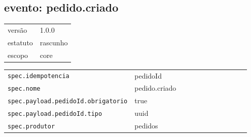 \subsection*{evento: pedido.criado}
\begin{tabular}{@{}ll@{}}
versão & 1.0.0 \\
estatuto & rascunho \\
escopo & core \\
\end{tabular}

\begin{tabular}{@{}p{0.35\linewidth}p{0.6\linewidth}@{}}
\texttt{spec.idempotencia} & pedidoId \\
\texttt{spec.nome} & pedido.criado \\
\texttt{spec.payload.pedidoId.obrigatorio} & true \\
\texttt{spec.payload.pedidoId.tipo} & uuid \\
\texttt{spec.produtor} & pedidos \\
\end{tabular}
